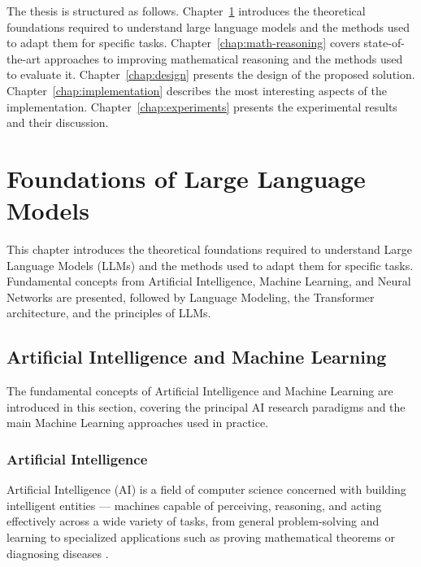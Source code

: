   The thesis is structured as follows.
  Chapter~\ref{chap:llms} introduces the
  theoretical foundations required to understand
  large language models and the methods used to
  adapt them for specific tasks.
  Chapter~\ref{chap:math-reasoning} covers
  state-of-the-art approaches to improving
  mathematical reasoning and the methods used
  to evaluate it. Chapter~\ref{chap:design}
  presents the design of the proposed solution.
  Chapter~\ref{chap:implementation} describes
  the most interesting aspects of the
  implementation. Chapter~\ref{chap:experiments}
  presents the experimental results and their
  discussion.
\chapter{Foundations of Large Language Models}
\label{chap:llms}

This chapter introduces the theoretical foundations required
to understand Large Language Models (LLMs) and the methods used
to adapt them for specific tasks. Fundamental concepts from Artificial Intelligence,
Machine Learning, and Neural Networks are presented, followed by  Language Modeling, the
Transformer architecture,
and the principles of LLMs.

\section{Artificial Intelligence and Machine Learning}
\label{sec:ai-ml}
The fundamental concepts of Artificial Intelligence and Machine
  Learning are introduced in this section, covering the principal
  AI research paradigms and the main Machine Learning approaches
  used in practice.

\subsection{Artificial Intelligence}

Artificial Intelligence (AI) is a field of computer
  science concerned with building intelligent entities
  --- machines capable of perceiving, reasoning, and
  acting effectively across a wide variety of tasks,
  from general problem-solving and learning to
  specialized applications such as proving mathematical
  theorems or diagnosing diseases \cite{russell2022}.

